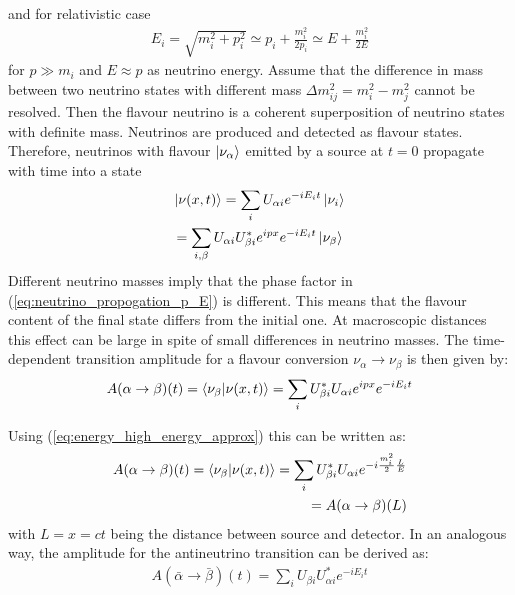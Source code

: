 and for relativistic case
\begin{eqnarray}
\label{eq:energy_high_energy_approx}
    E_i = \sqrt{m_i ^2 + p_i ^2 } \simeq p_i + \frac{m_i ^2}{2p_i} \simeq E + \frac{m_i ^2}{2E}
\end{eqnarray}
for \(p \gg m_i\) and \(E\approx p\) as neutrino energy. Assume that the difference in mass between two neutrino states with different mass \(\Delta m_{ij} ^2 = m_i ^2 - m_j ^2\) cannot be resolved. Then the flavour neutrino is a coherent superposition of neutrino states with definite mass. Neutrinos are produced and detected as flavour states. Therefore, neutrinos with flavour \(\ket{\nu_\alpha}\) emitted by a source at 
\(t = 0\) propagate with time into a state
\begin{eqnarray}
    \begin{gathered}
\label{eq:neutrino_propogation_p_E}
    \ket{\nu (x, t)} = \sum_{i} U_{\alpha i}e^{-i E_i t}\ket{\nu _i} \\ = \sum_{i, \beta} U_{\alpha i}U^*_{\beta i} e^{ip x}e^{-i E_i t}\ket{\nu _\beta} 
\end{gathered}
\end{eqnarray}
Different neutrino masses imply that the phase factor in (\ref{eq:neutrino_propogation_p_E}) is different. This means
that the flavour content of the final state differs from the initial one. At macroscopic
distances this effect can be large in spite of small differences in neutrino masses. The
time-dependent transition amplitude for a flavour conversion \(\nu_\alpha \to \nu_\beta\) is then given by:
\begin{equation}
\label{eq:transition_amplitude_neutrino}
       A(\alpha \to \beta)(t) = \bra{\nu_\beta}\ket{\nu (x, t)}
       = \sum_{i} U^*_{\beta i}U _{\alpha i} e^{ip x} e^{-i E_i t}
\end{equation}


Using (\ref{eq:energy_high_energy_approx}) this can be written as:
\begin{equation}
\label{eq:transition_amplitude_antineutrino}
    \begin{aligned}
         A(\alpha \to \beta)(t) = \bra{\nu_\beta}\ket{\nu (x, t)} = \sum_{i} U^*_{\beta i}U_{\alpha i} e^{-i \frac{m_i ^2}{2} \frac{L}{E}}\\
         = A(\alpha \to \beta)(L)\\
    \end{aligned}
\end{equation}
with \(L = x = ct\) being the distance between source and detector. In an analogous way, the amplitude for the antineutrino transition can be derived as:
\begin{eqnarray}
    A(\bar{\alpha} \to \bar{\beta})(t) = \sum_{i} U_{\beta i}U^* _{\alpha i} e^{-i E_i t} 
\end{eqnarray}

